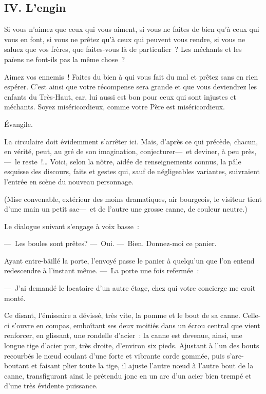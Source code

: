 \documentclass[french,twoside]{book} %
\begin{document}
 \subsection[{IV. L’engin}]{IV. L’engin}
\noindent Si vous n’aimez que ceux qui vous aiment, si vous ne faites de bien qu’à ceux qui vous en font, si vous ne prêtez qu’à ceux qui peuvent vous rendre, si vous ne saluez que vos frères, que faites-vous là de particulier ? Les méchants et les païens ne font-ils pas la même chose ?\par
Aimez vos ennemis ! Faites du bien à qui vous fait du mal et prêtez sans en rien espérer. C’est ainsi que votre récompense sera grande et que vous deviendrez les enfants du Très-Haut, car, lui aussi est bon pour ceux qui sont injustes et méchants. Soyez miséricordieux, comme votre Père est miséricordieux.\par
Évangile.\par
La circulaire doit évidemment s’arrêter ici. Mais, d’après ce qui précède, chacun, en vérité, peut, au gré de son imagination, conjecturer— et deviner, à peu près, — le reste !… Voici, selon la nôtre, aidée de renseignements connus, la pâle esquisse des discours, faits et gestes qui, sauf de négligeables variantes, suivraient l’entrée en scène du nouveau personnage.\par
   (Mise convenable, extérieur des moins dramatiques, air bourgeois, le visiteur tient d’une main un petit sac— et de l’autre une grosse canne, de couleur neutre.)\par
Le dialogue suivant s’engage à voix basse :\par
— Les boules sont prêtes? — Oui. — Bien. Donnez-moi ce panier.\par
Ayant entre-bâillé la porte, l’envoyé passe le panier à quelqu’un que l’on entend redescendre à l’instant même. — La porte une fois refermée :\par
— J’ai demandé le locataire d’un autre étage, chez qui votre concierge me croit monté.\par
Ce disant, l’émissaire a dévissé, très vite, la pomme et le bout de sa canne. Celle-ci s’ouvre en compas, emboîtant ses deux moitiés dans un écrou central que vient renforcer, en glissant, une rondelle d’acier : la canne est devenue, ainsi, une longue tige d’acier pur, très droite, d’environ six pieds. Ajustant à l’un des bouts recourbés le nœud coulant d’une forte et vibrante corde gommée, puis s’arc-boutant et faisant plier toute la tige, il ajuste l’autre   nœud à l’autre bout de la canne, transfigurant ainsi le prétendu jonc en un arc d’un acier bien trempé et d’une très évidente puissance.\par
\end{document}
